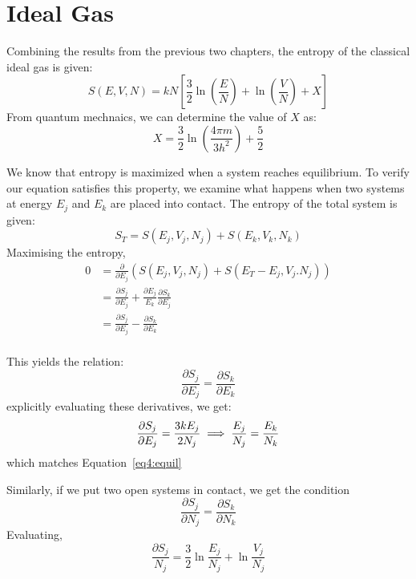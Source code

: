 \chapter{Ideal Gas}
Combining the results from the previous two chapters, the entropy of the classical ideal gas is given:
\begin{equation}
	S(E,V,N)=kN\left[\frac{3}{2}\ln\left(\frac{E}{N}\right)+\ln\left(\frac{V}{N}\right)+X\right]
\end{equation}
From quantum mechnaics, we can determine the value of \(X\) as:
\begin{equation}
	X=\frac{3}{2}\ln\left(\frac{4\pi m}{3 h^2}\right)+\frac{5}{2}
\end{equation}

We know that entropy is maximized when a system reaches equilibrium. To verify our equation satisfies this property, we examine what happens when two systems at energy \(E_j\) and \(E_k\) are placed into contact. The entropy of the total system is given:
\[S_T=S(E_j, V_j, N_j) + S(E_k, V_k, N_k)\]
Maximising the entropy,
\begin{align*}
	0&=\frac{\partial}{\partial E_j}\left(S(E_j, V_j, N_j)+S(E_T-E_j, V_j. N_j)\right)\\
	 &=\frac{\partial S_j}{\partial E_j}+\frac{\partial E_j}{E_k}\frac{\partial S_k}{\partial E_j}\\
	 &=\frac{\partial S_j}{\partial E_j}-\frac{\partial S_k}{\partial E_k}\\
\end{align*}

This yields the relation:
\begin{equation}
	\frac{\partial S_j}{\partial E_j} = \frac{\partial S_k}{\partial E_k}
\end{equation}
explicitly evaluating these derivatives, we get:
\begin{equation}
	\frac{\partial S_j}{\partial E_j}=\frac{3k E_j}{2N_j}\implies \frac{E_j}{N_j}=\frac{E_k}{N_k}\label{eq5:thermbeta}
\end{equation}
which matches Equation~\ref{eq4:equil}

Similarly, if we put two open systems in contact, we get the condition 
\begin{equation}
	\frac{\partial S_j}{\partial N_j} = \frac{\partial S_k}{\partial N_k}
\end{equation}
Evaluating, 
\begin{equation}
	\frac{\partial S_j}{N_j}=\frac{3}{2}\ln\frac{E_j}{N_j}+\ln\frac{V_j}{N_j}
\end{equation}


